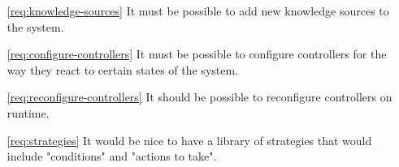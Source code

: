 \documentclass[]{lofar}
\begin{document}
  \label{app:requirements-list}\hypertarget{app:requirements-list}{}
    \begin{itemize}
      \item [\ref{req:knowledge-sources}]It must be possible to add
        new knowledge sources to the system.
      \item [\ref{req:configure-controllers}]It must be possible to
        configure controllers for the way they react to certain states
        of the system.
      \item [\ref{req:reconfigure-controllers}]It should be possible
        to reconfigure controllers on runtime.
      \item [\ref{req:strategies}]It would be nice to have a library
        of strategies that would include "conditions" and "actions to
        take".
    \end{itemize}
\end{document}
